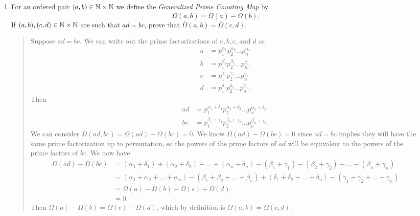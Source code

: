 \documentclass{hw}
\begin{document}
\begin{enumerate}
\item For an ordered pair $(a,b)\in\mathbb{N}\times\mathbb{N}$ we define the \textit{Generalized Prime Counting Map}
by \[\overline{\Omega}(a,b)=\Omega(a)-\Omega(b).\] If $(a,b),(c,d)\in\mathbb{N}\times\mathbb{N}$ are such that
$ad=bc$, prove that $\overline{\Omega}(a,b)=\overline{\Omega}(c,d)$.
\begin{quote}
Suppose $ad=bc$. We can write out the prime factorizations of $a,b,c$, and $d$ as
\begin{align*}
a &= p_{1}^{\alpha_{1}}p_{2}^{\alpha_{2}}\dots p_{n}^{\alpha_{n}}\\
b &= p_{1}^{\beta_{1}}p_{2}^{\beta_{2}}\dots p_{n}^{\beta_{n}}\\
c &= p_{1}^{\gamma_{1}}p_{2}^{\gamma_{2}}\dots p_{n}^{\gamma_{n}}\\
d &= p_{1}^{\delta_{1}}p_{2}^{\delta_{2}}\dots p_{n}^{\delta_{n}}.
\end{align*}
Then
\begin{align*}
ad&=p_{1}^{\alpha_{1}+\delta_{1}}p_{2}^{\alpha_{2}+\delta_{2}}\dots p_{n}^{\alpha_{n}+\delta_{n}}\\
bc&=p_{1}^{\beta_{1}+\gamma_{1}}p_{2}^{\beta_{2}+\gamma_{2}}\dots p_{n}^{\beta_{n}+\gamma_{n}}.
\end{align*}
We can consider $\overline{\Omega}(ad,bc)=\Omega(ad)-\Omega(bc)=0$. We know
$\Omega(ad)-\Omega(bc)=0$ since $ad=bc$ implies they will have the same prime factorization up to
permutation, so the powers of the prime factors of $ad$ will be equivalent to the powers of the prime
factors of $bc$. We now have
\begin{align*}
\Omega(ad)-\Omega(bc)&=(\alpha_{1}+\delta_{1})+(\alpha_{2}+\delta_{2})+\dots+(\alpha_{n}+\delta_{n})
- (\beta_{1}+\gamma_{1})-(\beta_{2}+\gamma_{2})-\dots-(\beta_{n}+\gamma_{n})\\
&= (\alpha_{1}+\alpha_{2}+\dots+\alpha_{n})-(\beta_{1}+\beta_{2}+\dots+\beta_{n})+
(\delta_{1}+\delta_{2}+\dots+\delta_{n})-(\gamma_{1}+\gamma_{2}+\dots+\gamma_{n})\\
&=\Omega(a)-\Omega(b)-\Omega(c)+\Omega(d)\\
&= 0.
\end{align*}
Then $\Omega(a)-\Omega(b)=\Omega(c)-\Omega(d)$, which by definition is
$\overline{\Omega}(a,b)=\overline{\Omega}(c,d)$.
\end{quote}


\end{enumerate}
\end{document}
